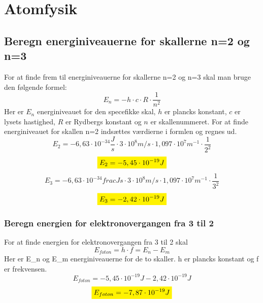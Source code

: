 \section{Atomfysik}
\subsection{Beregn energiniveauerne for skallerne n=2 og n=3}
For at finde frem til energiniveauerne for skallerne n=2 og n=3 skal man bruge den følgende formel:
\begin{equation*}
    E_n=-h\cdot c \cdot R \cdot \frac{1}{n^2}
\end{equation*}
Her er \begin{math}E_n\end{math} energiniveauet for den specefikke skal, \begin{math}h\end{math} er plancks konstant, \begin{math}c\end{math} er lysets hastighed, \begin{math}R\end{math} er Rydbergs konstant og \begin{math}n\end{math} er skallenummeret.
For at finde energiniveauet for skallen n=2 indsættes værdierne i formlen og regnes ud.
\begin{equation*}
    E_2=-6,63 \cdot 10^{-34} \frac{J}{s} \cdot 3 \cdot 10^8 m/s \cdot 1,097 \cdot 10^7 m^{-1}\cdot \frac{1}{2^2}
\end{equation*}
\begin{equation*}
    \mathcolorbox{yellow}{E_2=-5,45 \cdot 10^{-19} J}
\end{equation*}
\begin{equation*}
    E_3=-6,63 \cdot 10^{-34} frac{J}{s}  \cdot 3 \cdot 10^8 m/s \cdot 1,097 \cdot 10^7 m^{-1}\cdot \frac{1}{3^2}
\end{equation*}
\begin{equation*}
    \mathcolorbox{yellow}{E_3=-2,42 \cdot 10^{-19} J}
\end{equation*}
\subsubsection{Beregn energien for elektronovergangen fra 3 til 2}
For at finde energien for elektronovergangen fra 3 til 2 skal
\begin{equation*}
    E_{foton} = h \cdot f = E_n - E_m
\end{equation*}
Her er E\_n og E\_m energiniveauerne for de to skaller. h er plancks konstant og f er frekvensen.
\begin{equation*}
    E_{foton} = -5,45 \cdot 10^{-19} J - 2,42 \cdot 10^{-19} J
\end{equation*}
\begin{equation*}
    \mathcolorbox{yellow}{E_{foton} = -7,87 \cdot 10^{-19} J}
\end{equation*}

